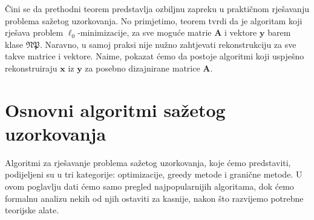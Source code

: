 \documentclass[a4paper,twoside,12pt]{memoir} %
\newcommand{\vect}[1]{\mathbf{#1}}
\renewcommand{\vec}{\vect}
\begin{document}
\v{C}ini se da prethodni teorem predstavlja ozbiljnu zapreku u prakti\v{c}nom rje\v{s}avanju problema sa\v{z}etog uzorkovanja. No primjetimo, teorem tvrdi da je algoritam koji rje\v{s}ava problem $\ell_0$-minimizacije, za sve mogu\'ce matrie $\vec A$ i vektore $\vec y$ barem klase $\mathfrak{NP}$. Naravno, u samoj praksi nije nu\v{z}no zahtjevati rekonstrukciju za sve takve matrice i vektore. Naime, pokazat \'cemo da postoje algoritmi koji uspje\v{s}no rekonstruiraju $\vec x$ iz $\vec y$ za posebno dizajnirane matrice $\vec A$.




\chapter[Osnovni algoritmi sa\v{z}etog uzorkovanja][Osnovni algoritmi sa\v{z}etog uzorkovanja]{Osnovni algoritmi sa\v{z}etog uzorkovanja}\label{chapter_algoritmi}
Algoritmi za rje\v{s}avanje problema sa\v{z}etog uzorkovanja, koje \'cemo predstaviti, podijeljeni su u tri kategorije: optimizacije, greedy metode i grani\v{c}ne metode. U ovom poglavlju dati \'cemo samo pregled najpopularnijih algoritama, dok \'cemo formalnu analizu nekih od njih ostaviti za kasnije, nakon \v{s}to razvijemo potrebne teorijske alate.
\end{document}
